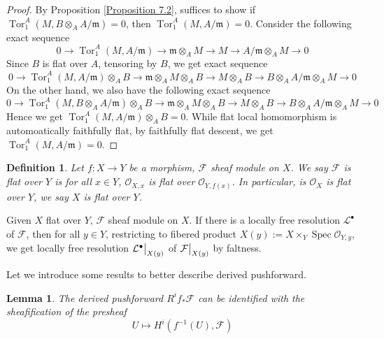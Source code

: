 \documentclass{ctexart}
\newtheorem{definition}{Definition}[section]
\newtheorem{lemma}{Lemma}[section]
\newcommand{\tor}{\operatorname{Tor}}
\newcommand{\spec}{\operatorname{Spec}}
\begin{document}
\begin{proof}
    By Proposition \ref{Proposition 7.2}, suffices to show if $\tor_{1}^{A}(M, B \otimes_{A} A/\mathfrak{m}) = 0$,
    then $\tor_{1}^{A}(M, A/\mathfrak{m}) = 0$.
    Consider the following exact sequence
    \begin{equation}
        0 \longrightarrow \tor_{1}^{A}(M, A/\mathfrak{m}) \longrightarrow \mathfrak{m} \otimes_{A} M \longrightarrow M \longrightarrow A/\mathfrak{m} \otimes_{A} M \longrightarrow 0
    \end{equation}
    Since $B$ is flat over $A$, tensoring by $B$, we get exact sequence
    \begin{equation}
        0 \longrightarrow \tor_{1}^{A}(M, A/\mathfrak{m}) \otimes_{A} B \longrightarrow \mathfrak{m} \otimes_{A} M \otimes_{A} B \longrightarrow M \otimes_{A} B \longrightarrow B \otimes_{A} A/\mathfrak{m} \otimes_{A} M \longrightarrow 0
    \end{equation}
    On the other hand, we also have the following exact sequence
    \begin{equation}
        0 \rightarrow \tor_{1}^{A}(M, B \otimes_{A} A/\mathfrak{m}) \otimes_{A} B \rightarrow \mathfrak{m} \otimes_{A} M \otimes_{A} B \rightarrow M \otimes_{A} B \rightarrow B \otimes_{A} A/\mathfrak{m} \otimes_{A} M \rightarrow 0
    \end{equation}
    Hence we get $\tor_{1}^{A}(M, A/\mathfrak{m}) \otimes_{A} B = 0$.
    While flat local homomorphism is automoatically faithfully flat, by faithfully flat descent, we get $\tor_{1}^{A}(M, A/\mathfrak{m}) = 0$.
\end{proof}
\begin{definition}
    Let $f: X \rightarrow Y$ be a morphism, $\mathcal{F}$ sheaf module on $X$.
    We say $\mathcal{F}$ is flat over $Y$ is for all $x\in Y$, $\mathcal{O}_{X, x}$ is flat over $\mathcal{O}_{Y, f(x)}$.
    In particular, is $\mathcal{O}_{X}$ is flat over $Y$, we say $X$ is flat over $Y$.
\end{definition}
Given $X$ flat over $Y$, $\mathcal{F}$ sheaf module on $X$.
If there is a locally free resolution $\mathcal{L}^{\bullet}$ of $\mathcal{F}$,
then for all $y\in Y$, restricting to fibered product $X(y) := X \times_{Y} \spec \mathcal{O}_{Y, y}$, we get locally free resolution $\mathcal{L}^{\bullet}\big{|}_{X(y)}$ of $\mathcal{F}\big{|}_{X(y)}$ by faltness.
\par
Let we introduce some results to better describe derived pushforward.
\begin{lemma}
    The derived pushforward $R^{i}f_{\ast}\mathcal{F}$ can be identified with the sheafification of the presheaf
    \begin{equation}
        U \longmapsto H^{i}(f^{-1}(U), \mathcal{F})
    \end{equation}
    \label{Lemma 7.1}
\end{lemma}
\end{document}
